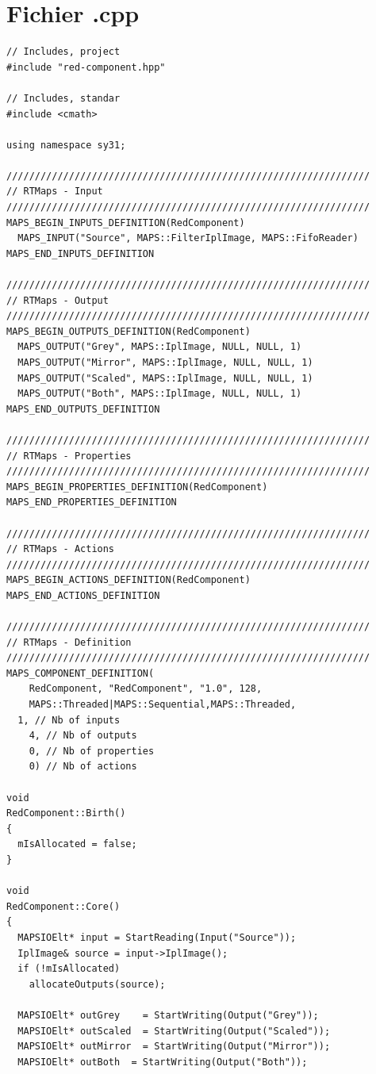 \section{Fichier .cpp}
\begin{lstlisting}
// Includes, project
#include "red-component.hpp"

// Includes, standar
#include <cmath>

using namespace sy31;

////////////////////////////////////////////////////////////////
// RTMaps - Input
////////////////////////////////////////////////////////////////
MAPS_BEGIN_INPUTS_DEFINITION(RedComponent)
  MAPS_INPUT("Source", MAPS::FilterIplImage, MAPS::FifoReader)
MAPS_END_INPUTS_DEFINITION

////////////////////////////////////////////////////////////////
// RTMaps - Output
////////////////////////////////////////////////////////////////
MAPS_BEGIN_OUTPUTS_DEFINITION(RedComponent)
  MAPS_OUTPUT("Grey", MAPS::IplImage, NULL, NULL, 1)
  MAPS_OUTPUT("Mirror", MAPS::IplImage, NULL, NULL, 1)
  MAPS_OUTPUT("Scaled", MAPS::IplImage, NULL, NULL, 1)
  MAPS_OUTPUT("Both", MAPS::IplImage, NULL, NULL, 1)
MAPS_END_OUTPUTS_DEFINITION

////////////////////////////////////////////////////////////////
// RTMaps - Properties
////////////////////////////////////////////////////////////////
MAPS_BEGIN_PROPERTIES_DEFINITION(RedComponent)
MAPS_END_PROPERTIES_DEFINITION

////////////////////////////////////////////////////////////////
// RTMaps - Actions
////////////////////////////////////////////////////////////////
MAPS_BEGIN_ACTIONS_DEFINITION(RedComponent)
MAPS_END_ACTIONS_DEFINITION

////////////////////////////////////////////////////////////////
// RTMaps - Definition
////////////////////////////////////////////////////////////////
MAPS_COMPONENT_DEFINITION(
	RedComponent, "RedComponent", "1.0", 128,
	MAPS::Threaded|MAPS::Sequential,MAPS::Threaded,
  1, // Nb of inputs
	4, // Nb of outputs
	0, // Nb of properties
	0) // Nb of actions

void
RedComponent::Birth()
{
  mIsAllocated = false;
}

void
RedComponent::Core() 
{
  MAPSIOElt* input = StartReading(Input("Source"));
  IplImage& source = input->IplImage();
  if (!mIsAllocated)
    allocateOutputs(source);

  MAPSIOElt* outGrey    = StartWriting(Output("Grey"));
  MAPSIOElt* outScaled  = StartWriting(Output("Scaled"));
  MAPSIOElt* outMirror  = StartWriting(Output("Mirror"));
  MAPSIOElt* outBoth  = StartWriting(Output("Both"));


\end{lstlisting}
